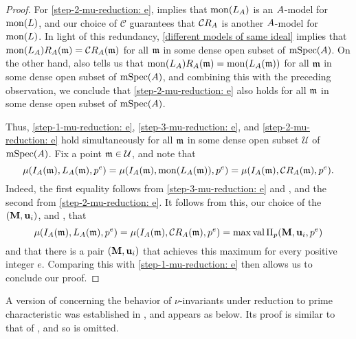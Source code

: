 \documentclass{amsart}
\begin{document}
\begin{proof}
For \eqref{step-2-mu-reduction: e},   implies that $\operatorname{mon}(L_A)$ is an $A$-model for $\operatorname{mon}(L)$, and our choice of $\mathcal{C}$ guarantees that $\mathcal{C} R_A$ is another $A$-model for $\operatorname{mon}(L)$.  In light of this redundancy, \ref{different models of same ideal} implies that $\operatorname{mon}(L_A) R_A(\mathfrak{m}) = \mathcal{C} R_A(\mathfrak{m})$ for all $\mathfrak{m}$ in some dense open subset of $\operatorname{mSpec}(A)$.  On the other hand,  also tells us that $\operatorname{mon}(L_A) R_A(\mathfrak{m}) = \operatorname{mon}(L_A(\mathfrak{m}))$ for all $\mathfrak{m}$ in some dense open subset of $\operatorname{mSpec}(A)$, and combining this with the preceding observation, we conclude that \eqref{step-2-mu-reduction: e} also holds for all $\mathfrak{m}$ in some dense open subset of $\operatorname{mSpec}(A)$.  

Thus, \eqref{step-1-mu-reduction: e}, \eqref{step-3-mu-reduction: e}, and \eqref{step-2-mu-reduction: e} hold simultaneously for all $\mathfrak{m}$ in some dense open subset $\mathcal{U}$ of $\operatorname{mSpec}(A)$.  Fix a point $\mathfrak{m} \in \mathcal{U}$, and note that
%
\[ \mu(I_A(\mathfrak{m}), L_A(\mathfrak{m}), p^e) = \mu(I_A(\mathfrak{m}), \operatorname{mon}(L_A(\mathfrak{m})), p^e) = \mu(I_A(\mathfrak{m}), \mathcal{C} R_A(\mathfrak{m}), p^e).\]
Indeed, the first equality follows from \eqref{step-3-mu-reduction: e} and , and the second from \eqref{step-2-mu-reduction: e}.  It follows from this,  our choice of the $(\mathbf{M}, \mathbf{u}_i)$, and , that 
%
\[ \mu(I_A(\mathfrak{m}), L_A(\mathfrak{m}), p^e) = \mu(I_A(\mathfrak{m}), \mathcal{C} R_A(\mathfrak{m}), p^e)  =  \max \operatorname{val} \Pi_p(\mathbf{M}, \mathbf{u}_i, p^e) \]
%
and that there is a pair $(\mathbf{M}, \mathbf{u}_i)$ that achieves this maximum for every positive integer $e$.  Comparing this with \eqref{step-1-mu-reduction: e}
 then allows us to conclude our proof.
\end{proof}

A version of  concerning the behavior of $\nu$-invariants  under reduction to prime characteristic was established in \cite[Section~4]{budur+mustata+saito.roots_bs_polys_monomial}, and appears as  below.  Its proof is similar to that of , and so is omitted.    
\end{document}
